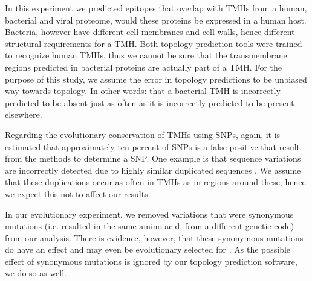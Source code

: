 
In this experiment we predicted epitopes that overlap with 
TMHs from a human, bacterial and viral proteome,
would these proteins be expressed in a human host.
Bacteria, however have different cell membranes and cell walls, 
hence different structural requirements for a TMH.
Both topology prediction tools were trained to recognize
human TMHs, thus we cannot be sure that
the transmembrane regions predicted in bacterial proteins
are actually part of a TMH.
For the purpose of this study, we assume the 
error in topology predictions to be unbiased way towards topology.
In other words: that a bacterial TMH is incorrectly
predicted to be absent just as often as it is incorrectly
predicted to be present elsewhere.


Regarding the evolutionary conservation of TMHs using SNPs,
again, it is estimated that approximately ten percent
of SNPs is a false positive that result from the methods to determine
a SNP. One example is that sequence variations are incorrectly
detected due to highly similar duplicated sequences \cite{musumeci2010single}.
We assume that these duplications occur as often in TMHs as in
regions around these, hence we expect this not to affect our results.

%
In our evolutionary experiment, 
we removed variations that were synonymous mutations (i.e.
resulted in the same amino acid, from a different genetic code) 
from our analysis.
There is evidence, however, that these synonymous mutations
do have an effect and may even be evolutionary selected 
for \cite{hunt2009silent}.
As the possible effect of synonymous mutations is ignored by our
topology prediction software, we do so as well.

\clearpage

